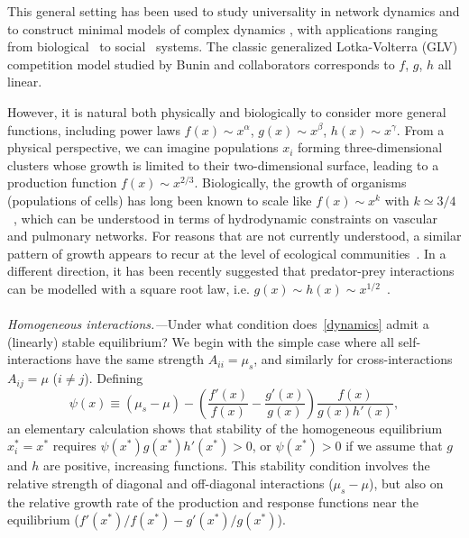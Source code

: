 \documentclass[
 prl,
 twocolumn,
 amsmath,
 amssymb,
 aps,
]{revtex4-2}
\begin{document}
This general setting has been used to study universality in network dynamics \cite{Barzel2013} and to construct minimal models of complex dynamics \cite{Barzel2015}, with applications ranging from biological~\cite{Alon2006,Karlebach2008} 
to social~\cite{Pastor-Satorras2001,Hufnagel2004,Dodds2005} systems.
The classic generalized Lotka-Volterra (GLV) competition model studied by Bunin and collaborators \cite{bunin2017ecological, biroli2018marginally} corresponds to $f$, $g$, $h$ all linear. 

However, it is natural both physically and biologically to consider more general functions, including power laws $f(x)\sim x^\alpha$, $g(x)\sim x^\beta$, $h(x) \sim x^\gamma$.
From a physical perspective, we can imagine populations $x_i$ forming three-dimensional clusters whose growth is limited to their two-dimensional surface, leading to a production function $f(x) \sim x^{2/3}$.
Biologically, the growth of organisms (populations of cells) has long been known to scale like $f(x) \sim x^k$ with $k\simeq 3/4$~\cite{Brown2004}, which can be understood in terms of hydrodynamic constraints on vascular and pulmonary networks.
For reasons that are not currently understood, a similar pattern of growth appears to recur at the level of ecological communities~\cite{Hatton2015,Hatton2024}.
In a different direction, it has been recently suggested that predator-prey interactions can be modelled with a square root law, i.e. $g(x) \sim h(x) \sim x^{1/2}$~\cite{Barbier2021,mazzarisi2024}.

\paragraph*{}
\emph{Homogeneous interactions.---}Under what condition does~\eqref{dynamics} admit a (linearly) stable equilibrium? 
We begin with the simple case where all self-interactions have the same strength $A_{ii} = \mu_s$, and similarly for cross-interactions $A_{ij} = \mu$ ($i\neq j$).
Defining 
\begin{equation}
    \psi(x) \equiv (\mu_s - \mu) -  \left(\frac{f'(x)}{f(x)} - \frac{g'(x)}{g(x)}\right)\frac{f(x)}{g(x)h'(x)},
    \label{eq: psi}
\end{equation}
an elementary calculation shows that stability of the homogeneous equilibrium $x_i^* = x^*$ requires $\psi(x^*)g(x^*)h'(x^*) > 0$, or $\psi(x^*)>0$ if we assume that $g$ and $h$ are positive, increasing functions. This stability condition involves the relative strength of diagonal and off-diagonal interactions ($\mu_s - \mu$), but also on the relative growth rate of the production and response functions near the equilibrium ($f'(x^*)/f(x^*) - g'(x^*)/g(x^*)$).
\end{document}
